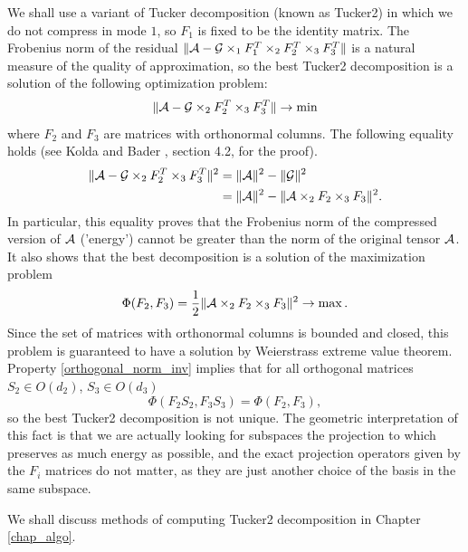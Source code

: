 We shall use a variant of Tucker decomposition (known as Tucker2)
in which we do not compress in mode $1$, so $F_1$ is fixed to be
the identity matrix.  
The Frobenius norm of the residual $\| \mathcal{A} - \mathcal{G} \times _{1} F^T_1 \times _{2} F^T _2 \times _{3} F^T_3 \|$ is a natural measure of the quality of approximation, 
so the best Tucker2 decomposition is a solution of
the following optimization problem:
\begin{equation}
    \label{tucker_min}
\| \mathcal{A} - \mathcal{G} \times_2 F_2^T \times_3 F_3^T \| \to \min
\end{equation}
where $F_2$ and $F_3$ are matrices with orthonormal columns.
The following equality holds (see Kolda and Bader \cite{kolda_bader_2009}, section 4.2, for the proof).
\begin{equation}
\label{tucker_min_max}
\begin{split}
    \| \mathcal{A} - \mathcal{G} \times_2 {F_2^T} \times_3 {F_3^T} \|^2  &= \| \mathcal{A} \|^2 - \| \mathcal{G} \|^2 \\
                                                       & = \| \mathcal{A} \|^2 - \| \mathcal{A} \times_2 {F_2} \times_3 {F_3} \|^2.
\end{split}
\end{equation}
In particular, this equality proves that the Frobenius norm
of the compressed version of $\mathcal{A}$ ('energy') cannot be greater than the norm
of the original tensor $\mathcal{A}$. It also shows that the best decomposition
is a solution of the maximization problem
\begin{equation}
\label{tucker_max}
\Phi(F_2, F_3) = \frac{1}{2} \| \mathcal{A} \times_2 F_2 \times_3 F_3 \|^2 \to \max.
\end{equation}
Since the set of matrices with orthonormal columns is bounded and closed,
this problem is guaranteed to have a solution by Weierstrass extreme value theorem.
Property \eqref{orthogonal_norm_inv} implies that
for all orthogonal matrices $S_2 \in O(d_2)$, $S_3 \in O(d_3)$
\begin{equation}
    \Phi(F_2 S_2, F_3 S_3) = \Phi(F_2, F_3),
\end{equation}
so the best Tucker2 decomposition is not unique. 
The geometric interpretation of this fact
is that we are actually looking for subspaces
the projection to which preserves as much energy
as possible, and the exact projection operators
given by the $F_i$ matrices do not matter, as they are 
just another choice of the basis in the same subspace.



We shall discuss methods of computing Tucker2 decomposition in Chapter \ref{chap_algo}.


